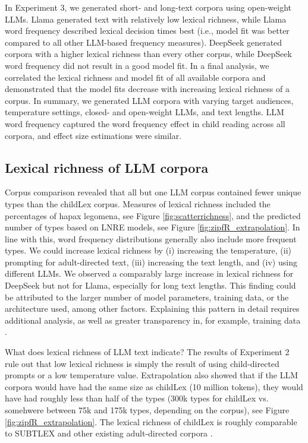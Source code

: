 \documentclass[doc, a4paper, anonymous]{apa7}
\begin{document}
In Experiment 3, we generated short- and long-text corpora using open-weight LLMs. Llama generated text with relatively low lexical richness, while Llama word frequency described lexical decision times best (i.e., model fit was better compared to all other LLM-based frequency measures). DeepSeek generated corpora with a higher lexical richness than every other corpus, while DeepSeek word frequency did not result in a good model fit. In a final analysis, we correlated the lexical richness and model fit of all available corpora and demonstrated that the model fits decrease with increasing lexical richness of a corpus. In summary, we generated LLM corpora with varying target audiences, temperature settings, closed- and open-weight LLMs, and text lengths. LLM word frequency captured the word frequency effect in child reading across all corpora, and effect size estimations were similar. 


\subsection*{Lexical richness of LLM corpora}

Corpus comparison revealed that all but one LLM corpus contained fewer unique types than the childLex corpus. Measures of lexical richness included the percentages of hapax legomena, see Figure \ref{fig:scatterrichness}, and the predicted number of types based on LNRE models, see Figure \ref{fig:zipfR_extrapolation}. In line with this, word frequency distributions generally also include more frequent types. We could increase lexical richness by (i) increasing the temperature, (ii) prompting for adult-directed text, (iii) increasing the text length, and (iv) using different LLMs. We observed a comparably large increase in lexical richness for DeepSeek but not for Llama, especially for long text lengths. This finding could be attributed to the larger number of model parameters, training data, or the architecture used, among other factors. Explaining this pattern in detail requires additional analysis, as well as greater transparency in, for example, training data \citep{liesenfeld_opening_2023}.

What does lexical richness of LLM text indicate? The results of Experiment 2 rule out that low lexical richness is simply the result of using child-directed prompts or a low temperature value. Extrapolation also showed that if the LLM corpora would have had the same size as childLex (10 million tokens), they would have had roughly less than half of the types (300k types for childLex vs. somehwere between 75k and 175k types, depending on the corpus), see Figure \ref{fig:zipfR_extrapolation}. The lexical richness of childLex is roughly comparable to SUBTLEX and other existing adult-directed corpora \citep{baayen_word_2001}.  
\end{document}
